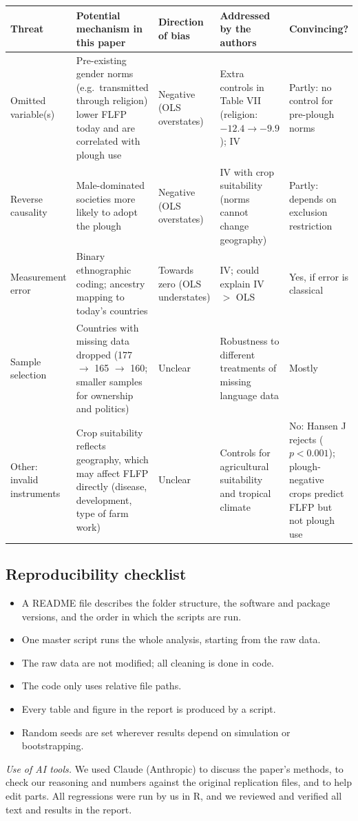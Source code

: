 \documentclass[11pt,a4paper]{article}
\renewcommand{\arraystretch}{1.25}
\begin{document}
{\renewcommand{\arraystretch}{1.4}%
\begin{tabularx}{\textwidth}{@{}>{\raggedright\arraybackslash}p{}
  L
  >{\raggedright\arraybackslash}p{0.13\textwidth}
  L
  >{\raggedright\arraybackslash}p{0.14\textwidth}@{}}
\toprule
Threat & Potential mechanism in this paper & Direction of bias & Addressed by the authors & Convincing? \\
\midrule
Omitted variable(s) & Pre-existing gender norms (e.g.\ transmitted through religion) lower FLFP today and are correlated with plough use & Negative (OLS overstates) & Extra controls in Table VII (religion: $-12.4 \to -9.9$); IV & Partly: no control for pre-plough norms \\
Reverse causality & Male-dominated societies more likely to adopt the plough & Negative (OLS overstates) & IV with crop suitability (norms cannot change geography) & Partly: depends on exclusion restriction \\
Measurement error & Binary ethnographic coding; ancestry mapping to today's countries & Towards zero (OLS understates) & IV; could explain IV $>$ OLS & Yes, if error is classical \\
Sample selection & Countries with missing data dropped (177 $\to$ 165 $\to$ 160; smaller samples for ownership and politics) & Unclear & Robustness to different treatments of missing language data & Mostly \\
Other: invalid instruments & Crop suitability reflects geography, which may affect FLFP directly (disease, development, type of farm work) & Unclear & Controls for agricultural suitability and tropical climate & No: Hansen J rejects ($p < 0.001$); plough-negative crops predict FLFP but not plough use \\
\bottomrule
\end{tabularx}}

\subsection{Reproducibility checklist}

\begin{itemize}[label=$\square$, leftmargin=*, itemsep=2pt]
  \item A README file describes the folder structure, the software and package versions, and the order in which the scripts are run.
  \item One master script runs the whole analysis, starting from the raw data.
  \item The raw data are not modified; all cleaning is done in code.
  \item The code only uses relative file paths.
  \item Every table and figure in the report is produced by a script.
  \item Random seeds are set wherever results depend on simulation or bootstrapping.
\end{itemize}

\textit{Use of AI tools.} We used Claude (Anthropic) to discuss the paper's methods, to check our reasoning and numbers against the original replication files, and to help edit parts. All regressions were run by us in R, and we reviewed and verified all text and results in the report.
\end{document}
